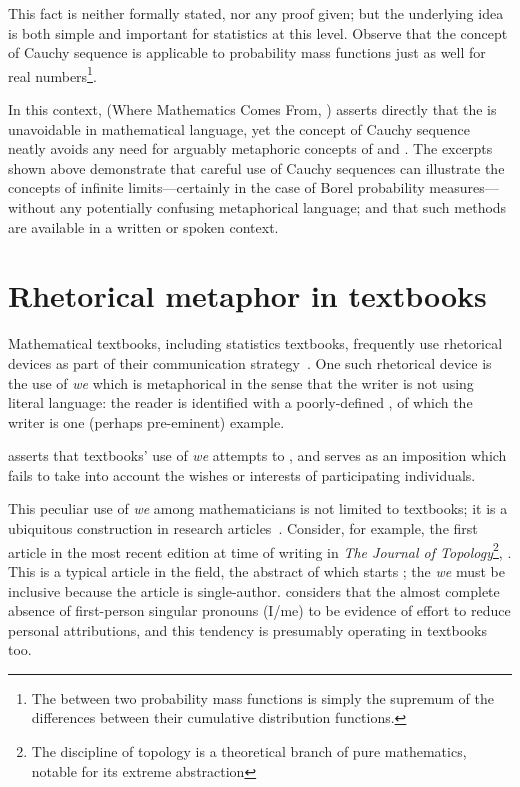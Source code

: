   \noindent
This fact is neither formally stated, nor any proof given; but the
underlying idea is both simple and important for statistics at this
level.  Observe that the concept of Cauchy sequence is applicable to
probability mass functions just as well for real numbers\footnote{The
   between two probability mass functions is simply
  the supremum of the differences between their cumulative
  distribution functions.}.

In this context, \wmcf (Where Mathematics Comes From,
\cite{lakoff2000}) asserts directly that the \bmi is unavoidable in
mathematical language, yet the concept of Cauchy sequence neatly
avoids any need for arguably metaphoric concepts of  and
.  The excerpts shown above demonstrate that
careful use of Cauchy sequences can illustrate the concepts of
infinite limits---certainly in the case of Borel probability
measures---without any potentially confusing metaphorical language;
and that such methods are available in a written or spoken context.

\section{Rhetorical \label{we_start} metaphor in textbooks}

Mathematical textbooks, including statistics textbooks, frequently use
rhetorical devices as part of their communication
strategy~\citep{kane1970}.  One such rhetorical device is the use of
\emph{we} which is metaphorical in the sense that the writer is not
using literal language: the reader is identified with a poorly-defined
, of which the writer is one (perhaps
pre-eminent) example.

\citeauthor{pimm1984} asserts that textbooks' use of \emph{we}
attempts to , and
serves as an imposition which fails to take into account the wishes or
interests of participating individuals.

This peculiar use of \emph{we} among mathematicians is not limited to
textbooks; it is a ubiquitous construction in research
articles~\parencite{kuo1999}.  Consider, for example, the first
article in the most recent edition at time of writing in \emph{The
  Journal of Topology}\footnote{The discipline of topology is a
  theoretical branch of pure mathematics, notable for its extreme
  abstraction}, \parencite{lange2016}. This is a typical article in
the field, the abstract of which starts ; the \emph{we} must be
inclusive because the article is single-author.  
considers that the almost complete absence of first-person singular
pronouns (I/me) to be evidence of effort to reduce personal
attributions, and this tendency is presumably operating in textbooks
too.

